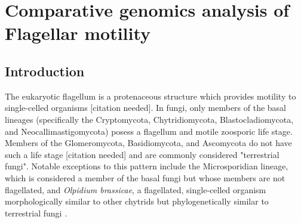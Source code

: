 \chapter{Comparative genomics analysis of Flagellar motility}
\label{app:Flagella}
\section{Introduction}
The eukaryotic flagellum is a protenaceous structure which provides motility to single-celled organisms [citation needed]. In fungi, only members of the basal lineages (specifically the Cryptomycota, Chytridiomycota, Blastocladiomycota, and Neocallimastigomycota) posess a flagellum and motile zoosporic life stage. Members of the Glomeromycota, Basidiomycota, and Ascomycota do not have such a life stage [citation needed] and are commonly considered "terrestrial fungi". Notable exceptions to this pattern include the Microsporidian lineage, which is considered a member of the basal fungi but whose members are not flagellated, and \textit{Olpidium brassicae}, a flagellated, single-celled organism morphologically similar to other chytrids but phylogenetically similar to terrestrial fungi \cite{Sekimoto2011}. \\
